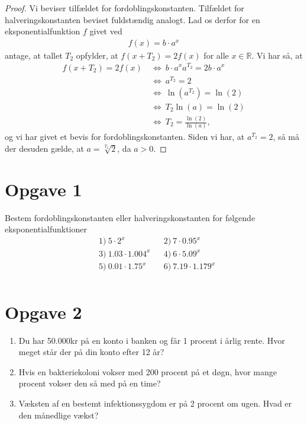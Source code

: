 \begin{proof}
Vi beviser tilfældet for fordoblingskonstanten. Tilfældet for halveringskonstanten beviset fuldstændig analogt. Lad os derfor for en eksponentialfunktion $f$ givet ved
\begin{align*}
f(x) = b\cdot a^x
\end{align*}
antage, at tallet $T_2$ opfylder, at $f(x+T_2) = 2f(x)$ for alle $x\in \mathbb{R}$. Vi har så, at 
\begin{align*}
f(x+T_2) = 2f(x) \ &\Leftrightarrow \ b\cdot a^{x}a^{T_2}=2b\cdot a^x\\
&\Leftrightarrow\ a^{T_2} = 2\\
&\Leftrightarrow\ \ln(a^{T_2}) = \ln(2)\\
&\Leftrightarrow\ T_2\ln(a) = \ln(2)\\
&\Leftrightarrow\ T_2 = \frac{\ln(2)}{\ln(a)},
\end{align*}
og vi har givet et bevis for fordoblingskonstanten. Siden vi har, at $a^{T_2} = 2$, så må der desuden gælde, at $a=\sqrt[T_2]{2}$, da $a>0$. 
\end{proof}
\section*{Opgave 1}
Bestem fordoblingskonstanten eller halveringskonstanten for følgende eksponentialfunktioner
\begin{align*}
	&1) \ 5\cdot 2^x   &&2) \ 7\cdot 0.95^x   \\
	&3) \ 1.03\cdot 1.004^x   &&4) \ 6\cdot 5.09^x   \\
	&5) \ 0.01\cdot 1.75^x   &&6) \ 7.19\cdot 1.179^x   \\		
\end{align*}

\section*{Opgave 2}
\begin{enumerate}[label=\roman*)]
\item Du har 50.000kr på en konto i banken og får 1 procent i årlig rente. Hvor meget står der på din konto efter 12 år?
\item Hvis en bakteriekoloni vokser med 200 procent på et døgn, hvor mange procent vokser den så med på en time?
\item Væksten af en bestemt infektionssygdom er på 2 procent om ugen. Hvad er den månedlige vækst?
\end{enumerate}
